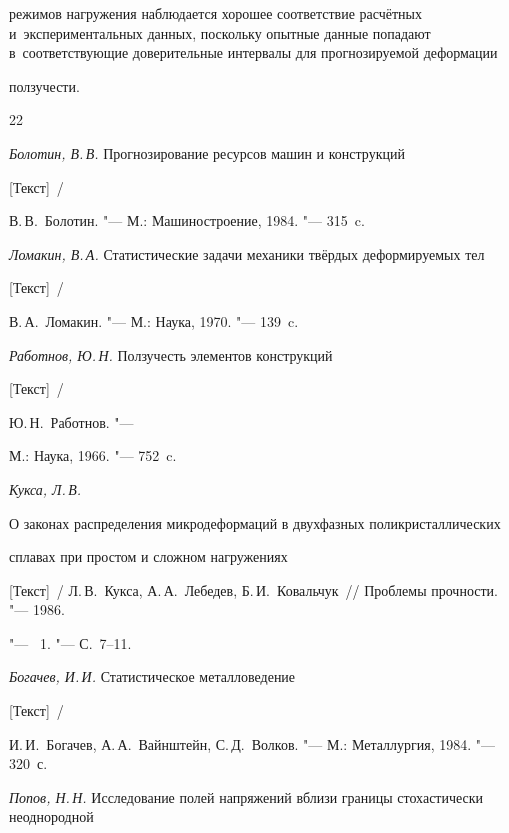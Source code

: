 режимов нагружения наблюдается хорошее соответствие расчётных и~экспериментальных данных, поскольку опытные данные попадают в~соответствующие доверительные интервалы для прогнозируемой деформации 

ползучести.





\begin{thebibliography}{22}

\item \textit{Болотин, В.\,В.} Прогнозирование ресурсов машин и конструкций

[Текст]~/

В.\,В.~Болотин. "--- М.: Машиностроение, 1984. "--- 315~c.



\item \textit{Ломакин, В.\,А.} Статистические задачи механики твёрдых деформируемых тел

[Текст]~/

В.\,А.~Ломакин. "--- М.: Наука, 1970. "--- 139~c.



\item \textit{Работнов, Ю.\,Н.} Ползучесть элементов конструкций 

[Текст]~/

Ю.\,Н.~Работнов. "--- 

М.: Наука, 1966. "--- 752~c.



\item \textit{Кукса, Л.\,В.} 

О законах распределения микродеформаций в двухфазных поликристаллических 

сплавах при простом и сложном нагружениях

[Текст]~/ Л.\,В.~Кукса, А.\,А.~Лебедев, Б.\,И.~Ковальчук~// Проблемы прочности. "--- 1986. 

"--- \No~1. "--- С.~7--11.



\item \textit{Богачев, И.\,И.} Статистическое металловедение

[Текст]~/ 

И.\,И.~Богачев, А.\,А.~Вайнштейн, С.\,Д.~Волков. "--- М.: Металлургия, 1984. "--- 320~с.



\item \textit{Попов, Н.\,Н.} Исследование полей напряжений вблизи границы стохастически неоднородной 


\end{thebibliography}
